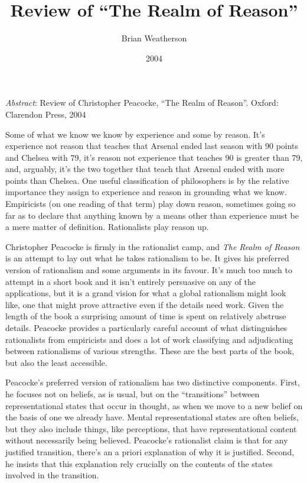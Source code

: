 \documentclass[
  11pt,
  letterpaper,
  DIV=11,
  numbers=noendperiod,
  twoside]{scrartcl}
\title{Review of ``The Realm of Reason''}
\author{Brian Weatherson}
\date{2004}
\renewenvironment{abstract}
 {\vspace{-1.25cm}
 \quotation\small\noindent\emph{Abstract}:}
 {\endquotation}
\begin{document}
\maketitle
\begin{abstract}
Review of Christopher Peacocke, ``The Realm of Reason''. Oxford:
Clarendon Press, 2004
\end{abstract}


Some of what we know we know by experience and some by reason. It's
experience not reason that teaches that Arsenal ended last season with
90 points and Chelsea with 79, it's reason not experience that teaches
90 is greater than 79, and, arguably, it's the two together that teach
that Arsenal ended with more points than Chelsea. One useful
classification of philosophers is by the relative importance they assign
to experience and reason in grounding what we know. Empiricists (on one
reading of that term) play down reason, sometimes going so far as to
declare that anything known by a means other than experience must be a
mere matter of definition. Rationalists play reason up.

Christopher Peacocke is firmly in the rationalist camp, and \emph{The
Realm of Reason} is an attempt to lay out what he takes rationalism to
be. It gives his preferred version of rationalism and some arguments in
its favour. It's much too much to attempt in a short book and it isn't
entirely persuasive on any of the applications, but it is a grand vision
for what a global rationalism might look like, one that might prove
attractive even if the details need work. Given the length of the book a
surprising amount of time is spent on relatively abstruse details.
Peacocke provides a particularly careful account of what distinguishes
rationalists from empiricists and does a lot of work classifying and
adjudicating between rationalisms of various strengths. These are the
best parts of the book, but also the least accessible.

Peacocke's preferred version of rationalism has two distinctive
components. First, he focuses not on beliefs, as is usual, but on the
``transitions'' between representational states that occur in thought,
as when we move to a new belief on the basis of one we already have.
Mental representational states are often beliefs, but they also include
things, like perceptions, that have representational content without
necessarily being believed. Peacocke's rationalist claim is that for any
justified transition, there's an a priori explanation of why it is
justified. Second, he insists that this explanation rely crucially on
the contents of the states involved in the transition.
\end{document}
